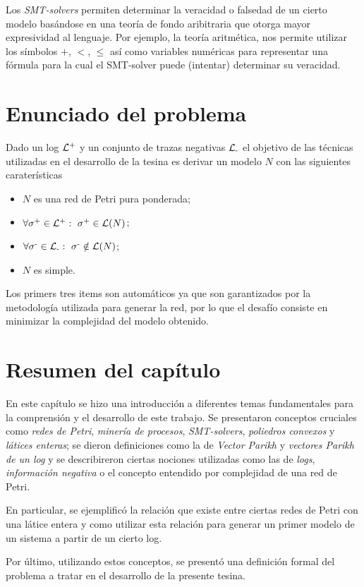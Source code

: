 Los \textit{SMT-solvers} permiten determinar la veracidad o falsedad de un cierto modelo
basándose en una teoría de fondo aribitraria que otorga mayor expresividad al lenguaje.
Por ejemplo, la teoría aritmética, nos permite utilizar los símbolos  $+$, $<$, $\leq$ 
así como variables numéricas para representar una fórmula para la cual 
el SMT-solver puede (intentar) determinar su veracidad.

\section{Enunciado del problema} 
\label{sec:2.problem}

Dado un log ${\mathcal L}\textsuperscript{+}$ y un conjunto de trazas negativas ${\mathcal L}\textsubscript{-}$ el objetivo de las técnicas utilizadas 
en el desarrollo de la tesina es derivar un modelo $N$ con las siguientes caraterísticas\\

\begin{itemize}
 \item $N$ es una red de Petri pura ponderada;
 \item $\forall \sigma\textsuperscript{+} \in {\mathcal L}\textsuperscript{+}:~ \sigma\textsuperscript{+} \in \mathcal{L}(N)$;
 \item $\forall \sigma\textsuperscript{-} \in {\mathcal L}\textsubscript{-}:~ \sigma\textsuperscript{-} \notin \mathcal{L}(N)$;
 \item $N$ es simple.\\
\end{itemize}

Los primers tres items son automáticos ya que son garantizados por la metodología utilizada
para generar la red, por lo que el desafío consiste en minimizar la complejidad del modelo obtenido.

\section{Resumen del capítulo}
\label{sec:2.resumen}
En este capítulo se hizo una introducción a diferentes temas fundamentales para la comprensión y el desarrollo de este trabajo. 
Se presentaron conceptos cruciales como \textit{redes de Petri}, \textit{minería de procesos},
\textit{SMT-solvers}, \textit{poliedros convexos} y \textit{látices enteras}; se dieron definiciones como la de \textit{Vector Parikh} 
y \textit{vectores Parikh de un log} y se describireron ciertas nociones 
utilizadas como las de \textit{logs}, \textit{información negativa} 
o el concepto  entendido por complejidad de una red de Petri.

En particular, se ejemplificó la relación que existe entre ciertas redes de Petri con una látice entera y 
como utilizar esta relación para generar un primer modelo de un sistema a partir de un cierto log.

Por último, utilizando estos conceptos, se presentó una definición formal del problema a tratar en el desarrollo
 de la presente tesina. 
